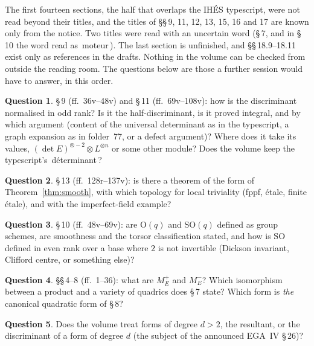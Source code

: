 \documentclass[11pt,a4paper]{amsart}
\newcommand{\q}[1]{\guillemotleft\,#1\,\guillemotright}
\newcommand{\Ort}{\mathrm{O}}
\newcommand{\SO}{\mathrm{SO}}
\theoremstyle{plain}
\theoremstyle{definition}
\newtheorem{question}{Question}
\begin{document}
The first fourteen sections, the half that overlaps the IHÉS typescript, were not read beyond their titles, and the titles of \S\S\,9, 11, 12, 13, 15, 16 and 17 are known only from the notice. Two titles were read with an uncertain word (\S\,7, and in \S\,10 the word read as \q{moteur}). The last section is unfinished, and \S\S\,18.9--18.11 exist only as references in the drafts. Nothing in the volume can be checked from outside the reading room. The questions below are those a further session would have to answer, in this order.

\begin{question}\label{qu:disc}
\S\,9 (ff.~36v--48v) and \S\,11 (ff.~69v--108v): how is the discriminant normalised in odd rank? Is it the half-discriminant, is it proved integral, and by which argument (content of the universal determinant as in the typescript, a graph expansion as in folder~77, or a defect argument)? Where does it take its values, $(\det E)^{\otimes-2}\otimes L^{\otimes n}$ or some other module? Does the volume keep the typescript's \q{déterminant}?
\end{question}

\begin{question}
\S\,13 (ff.~128r--137v): is there a theorem of the form of Theorem~\ref{thm:smooth}, with which topology for local triviality (fppf, étale, finite étale), and with the imperfect-field example?
\end{question}

\begin{question}
\S\,10 (ff.~48v--69v): are $\Ort(q)$ and $\SO(q)$ defined as group schemes, are smoothness and the torsor classification stated, and how is $\SO$ defined in even rank over a base where $2$ is not invertible (Dickson invariant, Clifford centre, or something else)?
\end{question}

\begin{question}
\S\S\,4--8 (ff.~1--36): what are $M^+_E$ and $M^-_E$? Which isomorphism between a product and a variety of quadrics does \S\,7 state? Which form is \emph{the} canonical quadratic form of \S\,8?
\end{question}

\begin{question}\label{qu:degree}
Does the volume treat forms of degree $d>2$, the resultant, or the discriminant of a form of degree $d$ (the subject of the announced EGA~IV \S\,26)?
\end{question}
\end{document}
